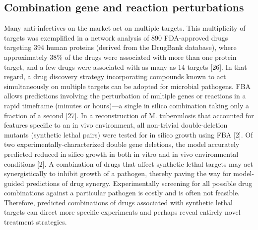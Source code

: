 \subsection{Combination gene and reaction perturbations}
Many anti-infectives on the market act on multiple targets. 
This multiplicity of targets was exemplified in a network 
analysis of 890 FDA-approved drugs targeting 394 human 
proteins (derived from the DrugBank database), where 
approximately 38\% of the drugs were associated with more 
than one protein target, and a few drugs were associated 
with as many as 14 targets [26]. In that regard, a drug 
discovery strategy incorporating compounds known to act 
simultaneously on multiple targets can be adopted for 
microbial pathogens. FBA allows predictions involving 
the perturbation of multiple genes or reactions in a rapid 
timeframe (minutes or hours)—a single in silico combination 
taking only a fraction of a second [27]. In a reconstruction 
of M. tuberculosis that accounted for features specific to 
an in vivo environment, all non-trivial double-deletion 
mutants (synthetic lethal pairs) were tested for in silico 
growth using FBA [2]. Of two experimentally-characterized 
double gene deletions, the model accurately predicted reduced 
in silico growth in both in vitro and in vivo environmental 
conditions [2]. A combination of drugs that affect synthetic 
lethal targets may act synergistically to inhibit growth of 
a pathogen, thereby paving the way for model-guided predictions 
of drug synergy. Experimentally screening for all possible 
drug combinations against a particular pathogen is costly 
and is often not feasible. Therefore, predicted combinations 
of drugs associated with synthetic lethal targets can direct 
more specific experiments and perhaps reveal entirely novel 
treatment strategies.

